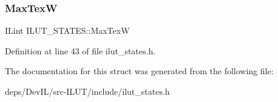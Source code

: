 \subsubsection{\texorpdfstring{Max\+TexW}{MaxTexW}}
{\footnotesize\ttfamily I\+Lint I\+L\+U\+T\+\_\+\+S\+T\+A\+T\+E\+S\+::\+Max\+TexW}



Definition at line 43 of file ilut\+\_\+states.\+h.



The documentation for this struct was generated from the following file\+:\begin{DoxyCompactItemize}
\item 
deps/\+Dev\+I\+L/src-\/\+I\+L\+U\+T/include/ilut\+\_\+states.\+h\end{DoxyCompactItemize}
